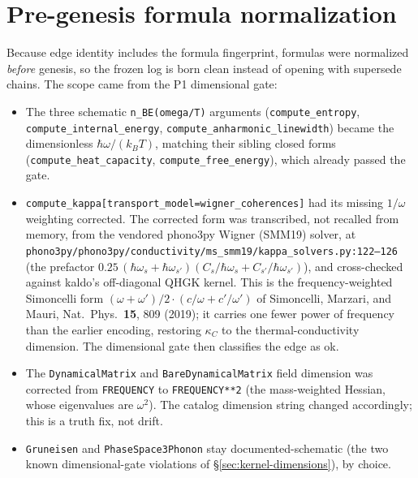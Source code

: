 \documentclass[11pt,a4paper]{article}
\begin{document}
\section{Pre-genesis formula normalization}
\label{sec:kernel-normalization}

Because edge identity includes the formula fingerprint, formulas were normalized
\emph{before} genesis, so the frozen log is born clean instead of opening with
supersede chains. The scope came from the P1 dimensional gate:
\begin{itemize}[leftmargin=2em, itemsep=0.25em]
  \item The three schematic \texttt{n\_BE(omega/T)} arguments
        (\texttt{compute\_entropy}, \texttt{compute\_internal\_energy},
        \texttt{compute\_anharmonic\_linewidth}) became the dimensionless
        $\hbar\omega/(k_B T)$, matching their sibling closed forms
        (\texttt{compute\_heat\_capacity}, \texttt{compute\_free\_energy}), which
        already passed the gate.
  \item \texttt{compute\_kappa[transport\_model=wigner\_coherences]} had its
        missing $1/\omega$ weighting corrected. The corrected form was
        transcribed, not recalled from memory, from the vendored phono3py Wigner
        (SMM19) solver, at
        \texttt{phono3py/phono3py/conductivity/ms\_smm19/kappa\_solvers.py:122--126}
        (the prefactor $0.25\,(\hbar\omega_s + \hbar\omega_{s'})(C_s/\hbar\omega_s
        + C_{s'}/\hbar\omega_{s'})$), and cross-checked against kaldo's
        off-diagonal QHGK kernel. This is the frequency-weighted Simoncelli form
        $(\omega + \omega')/2\cdot(c/\omega + c'/\omega')$ of Simoncelli, Marzari,
        and Mauri, Nat.\ Phys.\ \textbf{15}, 809 (2019); it carries one fewer
        power of frequency than the earlier encoding, restoring $\kappa_C$ to the
        thermal-conductivity dimension. The dimensional gate then classifies the
        edge as ok.
  \item The \texttt{DynamicalMatrix} and \texttt{BareDynamicalMatrix} field
        dimension was corrected from \texttt{FREQUENCY} to \texttt{FREQUENCY**2}
        (the mass-weighted Hessian, whose eigenvalues are $\omega^2$). The catalog
        dimension string changed accordingly; this is a truth fix, not drift.
  \item \texttt{Gruneisen} and \texttt{PhaseSpace3Phonon} stay
        documented-schematic (the two known dimensional-gate violations of
        \S\ref{sec:kernel-dimensions}), by choice.
\end{itemize}
\end{document}
